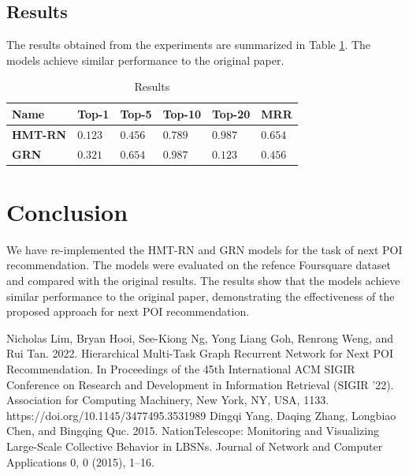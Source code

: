 \documentclass[twocolumn,twoside]{article}
\begin{document}
\subsection{Results}
The results obtained from the experiments are summarized in Table \ref{tab:results}.
The models achieve similar performance to the original paper.
\begin{table}
  \caption{Results}
  \centering
  \begin{tabular}{llllll}
    \toprule
    Name            & Top-1   & Top-5   & Top-10  & Top-20  & MRR     \\
    \midrule
    \midrule
    \textbf{HMT-RN} & $0.123$ & $0.456$ & $0.789$ & $0.987$ & $0.654$ \\
    \textbf{GRN}    & $0.321$ & $0.654$ & $0.987$ & $0.123$ & $0.456$ \\

    \bottomrule
  \end{tabular}
  \label{tab:results}
\end{table}
\section{Conclusion}
We have re-implemented the HMT-RN and GRN models for the task of
next POI recommendation. The models were evaluated on the refence
Foursquare dataset and compared with the original results. The
results show that the models achieve similar performance to the
original paper, demonstrating the effectiveness of the proposed
approach for next POI recommendation.
\begin{thebibliography}{9}
  Nicholas Lim, Bryan Hooi, See-Kiong Ng, Yong Liang Goh, Renrong Weng, and Rui Tan. 2022. Hierarchical Multi-Task Graph Recurrent Network for Next POI Recommendation. In Proceedings of the 45th International ACM SIGIR Conference on Research and Development in Information Retrieval (SIGIR '22). Association for Computing Machinery, New York, NY, USA, 1133. https://doi.org/10.1145/3477495.3531989
  Dingqi Yang, Daqing Zhang, Longbiao Chen, and Bingqing Quc. 2015. NationTelescope: Monitoring and Visualizing Large-Scale Collective Behavior in LBSNs.
  Journal of Network and Computer Applications 0, 0 (2015), 1–16.
\end{thebibliography}
\end{document}
